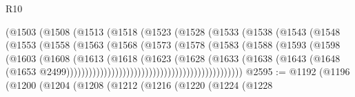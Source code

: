 \begin{lexlean}{R10}
\begin{coremodule}
                                    (@1503
                                      (@1508
                                        (@1513
                                          (@1518
                                            (@1523
                                              (@1528
                                                (@1533
                                                  (@1538
                                                    (@1543
                                                      (@1548
                                                        (@1553
                                                          (@1558
                                                            (@1563
                                                              (@1568
                                                                (@1573
                                                                  (@1578
                                                                    (@1583
                                                                      (@1588
                                                                        (@1593
                                                                          (@1598
                                                                            (@1603
                                                                              (@1608
                                                                                (@1613
                                                                                  (@1618
                                                                                    (@1623
                                                                                      (@1628
                                                                                        (@1633
                                                                                          (@1638
                                                                                            (@1643
                                                                                              (@1648
                                                                                                (@1653
                                                                                                  @2499)))))))))))))))))))))))))))))))))))))))))))))))
@2595 := @1192
    (@1196
      (@1200
        (@1204
          (@1208
            (@1212
              (@1216
                (@1220
                  (@1224
                    (@1228

\end{coremodule}
\end{lexlean}
